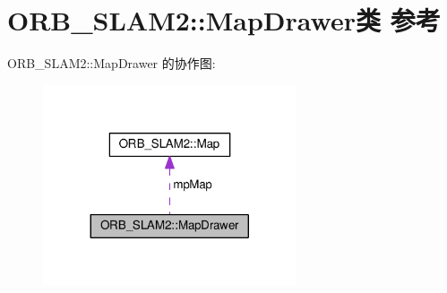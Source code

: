 \hypertarget{classORB__SLAM2_1_1MapDrawer}{\section{O\-R\-B\-\_\-\-S\-L\-A\-M2\-:\-:Map\-Drawer类 参考}
\label{classORB__SLAM2_1_1MapDrawer}
}


O\-R\-B\-\_\-\-S\-L\-A\-M2\-:\-:Map\-Drawer 的协作图\-:
\nopagebreak
\begin{figure}[H]
\begin{center}
\leavevmode
\includegraphics[width=212pt]{classORB__SLAM2_1_1MapDrawer__coll__graph}
\end{center}
\end{figure}
